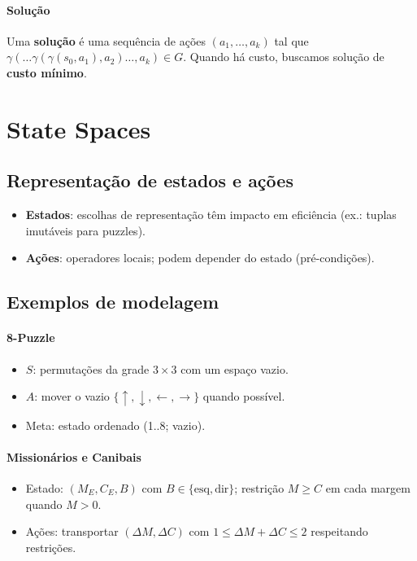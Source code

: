 \documentclass[9pt,a4paper]{extarticle}
\begin{document}
\paragraph{Solução}
Uma \textbf{solução} é uma sequência de ações $(a_1,\dots,a_k)$ tal que $\gamma(\dots\gamma(\gamma(s_0,a_1),a_2)\dots,a_k) \in G$.
Quando há custo, buscamos solução de \textbf{custo mínimo}.

\section{State Spaces}
\subsection*{Representação de estados e ações}
\begin{itemize}
  \item \textbf{Estados}: escolhas de representação têm impacto em eficiência (ex.: tuplas imutáveis para puzzles).
  \item \textbf{Ações}: operadores locais; podem depender do estado (pré-condições).
\end{itemize}

\subsection*{Exemplos de modelagem}
\paragraph{8-Puzzle}
\begin{itemize}
  \item $S$: permutações da grade $3\times 3$ com um espaço vazio.
  \item $A$: mover o vazio $\{\uparrow,\downarrow,\leftarrow,\rightarrow\}$ quando possível.
  \item Meta: estado ordenado (1..8; vazio).
\end{itemize}

\paragraph{Missionários e Canibais}
\begin{itemize}
  \item Estado: $(M_E, C_E, B)$ com $B\in\{\text{esq},\text{dir}\}$; restrição $M \ge C$ em cada margem quando $M>0$.
  \item Ações: transportar $(\Delta M, \Delta C)$ com $1 \le \Delta M+\Delta C \le 2$ respeitando restrições.
\end{itemize}
\end{document}
